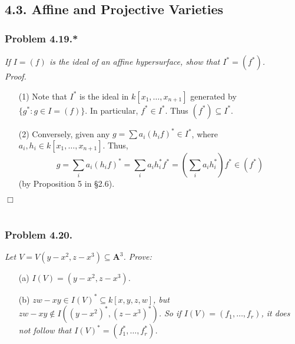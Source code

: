 \documentclass{article}
\begin{document}
\subsection*{4.3. Affine and Projective Varieties \\}



\subsubsection*{Problem 4.19.*}
\emph{If $I = (f)$ is the ideal of an affine hypersurface,
show that $I^{*} = (f^{*})$.} \\



\emph{Proof.}
\begin{enumerate}
\item[(1)]
  Note that $I^{*}$ is the ideal in $k[x_1,\ldots,x_{n+1}]$
  generated by $\{ g^{*} : g \in I = (f) \}$.
  In particular, $f^{*} \in I^{*}$. Thus $(f^{*}) \subseteq I^{*}$.

\item[(2)]
  Conversely,
  given any $g = \sum a_i (h_i f)^{*} \in I^{*}$,
  where $a_i, h_i \in k[x_1,\ldots,x_{n+1}]$.
  Thus,
  \[
    g
    = \sum_i a_i (h_i f)^{*}
    = \sum_i a_i h_i^{*} f^{*}
    = \left( \sum_i a_i h_i^{*} \right) f^{*} \in (f^{*})
  \]
  (by Proposition 5 in \S 2.6).
\end{enumerate}
$\Box$ \\\\






\subsubsection*{Problem 4.20.}
\emph{Let $V = V(y-x^2, z-x^3) \subseteq \mathbf{A}^{3}$. Prove:}
\begin{enumerate}
\item[(a)]
  \emph{$I(V) = (y-x^2, z-x^3)$.}

\item[(b)]
  \emph{$zw-xy \in I(V)^{*} \subseteq k[x,y,z,w]$,
  but $zw-xy \not\in I((y-x^2)^{*}, (z-x^3)^{*})$.
  So if $I(V) = (f_1, \ldots, f_r)$,
  it does not follow that $I(V)^{*} = (f_1^{*}, \ldots, f_r^{*})$.} \\
\end{enumerate}
\end{document}

